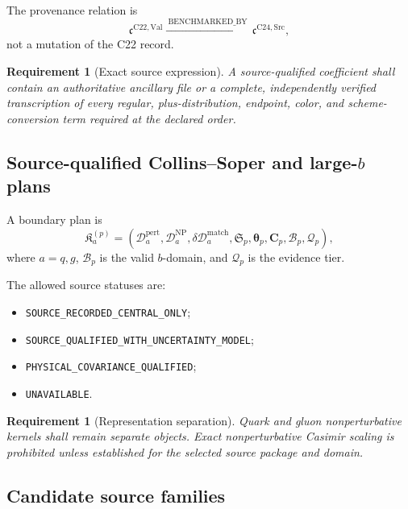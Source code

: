 \documentclass[11pt]{article}
\newtheorem{requirement}[definition]{Requirement}
\newcommand{\cD}{\mathcal D}
\begin{document}
The provenance relation is
\begin{equation}
 \mathfrak c^{\mathrm{C22,Val}}
 \xrightarrow{\ \mathrm{BENCHMARKED\_BY}\ }
 \mathfrak c^{\mathrm{C24,Src}},
 \label{eq:coefficient-benchmark-relation}
\end{equation}
not a mutation of the C22 record.

\begin{requirement}[Exact source expression]
A source-qualified coefficient shall contain an authoritative ancillary file or a complete, independently verified transcription of every regular, plus-distribution, endpoint, color, and scheme-conversion term required at the declared order.
\end{requirement}

\subsection{Source-qualified Collins--Soper and \texorpdfstring{large-\(b\)}{large-b} plans}

A boundary plan is
\begin{equation}
 \mathfrak K_a^{(p)}
 =
 \left(
 \cD_a^{\mathrm{pert}},
 \cD_a^{\mathrm{NP}},
 \delta\cD_a^{\mathrm{match}},
 \mathfrak S_p,
 \bm\theta_p,
 \bm C_p,
 \mathcal B_p,
 \mathcal Q_p
 \right),
 \label{eq:kernel-plan}
\end{equation}
where \(a=q,g\), \(\mathcal B_p\) is the valid \(b\)-domain, and \(\mathcal Q_p\) is the evidence tier.

The allowed source statuses are:
\begin{itemize}
\item \texttt{SOURCE\_RECORDED\_CENTRAL\_ONLY};
\item \texttt{SOURCE\_QUALIFIED\_WITH\_UNCERTAINTY\_MODEL};
\item \texttt{PHYSICAL\_COVARIANCE\_QUALIFIED};
\item \texttt{UNAVAILABLE}.
\end{itemize}

\begin{requirement}[Representation separation]
Quark and gluon nonperturbative kernels shall remain separate objects.  Exact nonperturbative Casimir scaling is prohibited unless established for the selected source package and domain.
\end{requirement}

\subsection{Candidate source families}
\end{document}
